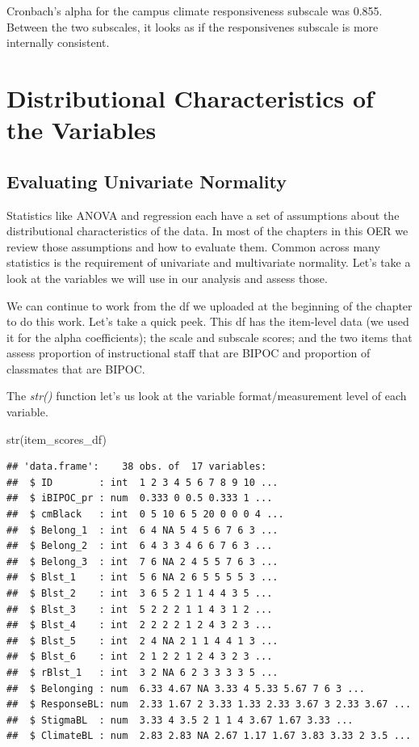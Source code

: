\documentclass[
  english,
]{book}
\newenvironment{Shaded}{\begin{snugshade}}{\end{snugshade}}
\newcommand{\FunctionTok}[1]{\textcolor[rgb]{0.00,0.00,0.00}{#1}}
\newcommand{\NormalTok}[1]{#1}
\begin{document}
Cronbach's alpha for the campus climate responsiveness subscale was 0.855. Between the two subscales, it looks as if the responsivenes subscale is more internally consistent.

\hypertarget{distributional-characteristics-of-the-variables}{%
\section{Distributional Characteristics of the Variables}\label{distributional-characteristics-of-the-variables}}

\hypertarget{evaluating-univariate-normality}{%
\subsection{Evaluating Univariate Normality}\label{evaluating-univariate-normality}}

Statistics like ANOVA and regression each have a set of assumptions about the distributional characteristics of the data. In most of the chapters in this OER we review those assumptions and how to evaluate them. Common across many statistics is the requirement of univariate and multivariate normality. Let's take a look at the variables we will use in our analysis and assess those.

We can continue to work from the df we uploaded at the beginning of the chapter to do this work. Let's take a quick peek. This df has the item-level data (we used it for the alpha coefficients); the scale and subscale scores; and the two items that assess proportion of instructional staff that are BIPOC and proportion of classmates that are BIPOC.

The \emph{str()} function let's us look at the variable format/measurement level of each variable.

\begin{Shaded}
\begin{Highlighting}[]
\FunctionTok{str}\NormalTok{(item\_scores\_df)}
\end{Highlighting}
\end{Shaded}

\begin{verbatim}
## 'data.frame':    38 obs. of  17 variables:
##  $ ID        : int  1 2 3 4 5 6 7 8 9 10 ...
##  $ iBIPOC_pr : num  0.333 0 0.5 0.333 1 ...
##  $ cmBlack   : int  0 5 10 6 5 20 0 0 0 4 ...
##  $ Belong_1  : int  6 4 NA 5 4 5 6 7 6 3 ...
##  $ Belong_2  : int  6 4 3 3 4 6 6 7 6 3 ...
##  $ Belong_3  : int  7 6 NA 2 4 5 5 7 6 3 ...
##  $ Blst_1    : int  5 6 NA 2 6 5 5 5 5 3 ...
##  $ Blst_2    : int  3 6 5 2 1 1 4 4 3 5 ...
##  $ Blst_3    : int  5 2 2 2 1 1 4 3 1 2 ...
##  $ Blst_4    : int  2 2 2 2 1 2 4 3 2 3 ...
##  $ Blst_5    : int  2 4 NA 2 1 1 4 4 1 3 ...
##  $ Blst_6    : int  2 1 2 2 1 2 4 3 2 3 ...
##  $ rBlst_1   : int  3 2 NA 6 2 3 3 3 3 5 ...
##  $ Belonging : num  6.33 4.67 NA 3.33 4 5.33 5.67 7 6 3 ...
##  $ ResponseBL: num  2.33 1.67 2 3.33 1.33 2.33 3.67 3 2.33 3.67 ...
##  $ StigmaBL  : num  3.33 4 3.5 2 1 1 4 3.67 1.67 3.33 ...
##  $ ClimateBL : num  2.83 2.83 NA 2.67 1.17 1.67 3.83 3.33 2 3.5 ...
\end{verbatim}
\end{document}
